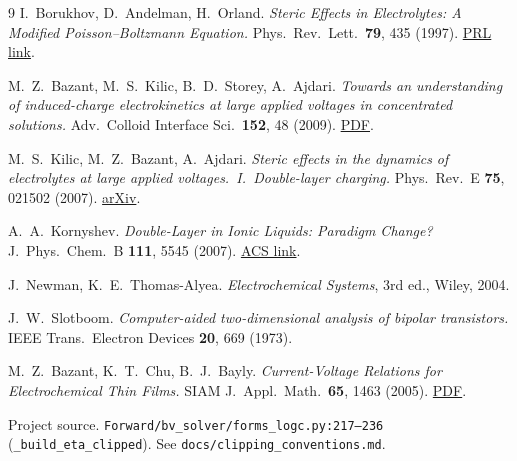 \documentclass[11pt]{article}
\begin{document}
\begin{thebibliography}{9}
I.\ Borukhov, D.\ Andelman, H.\ Orland.
\emph{Steric Effects in Electrolytes: A Modified Poisson--Boltzmann
Equation.}
Phys.\ Rev.\ Lett.\ \textbf{79}, 435 (1997).
\href{https://journals.aps.org/prl/abstract/10.1103/PhysRevLett.79.435}{PRL link}.

M.\ Z.\ Bazant, M.\ S.\ Kilic, B.\ D.\ Storey, A.\ Ajdari.
\emph{Towards an understanding of induced-charge electrokinetics at
large applied voltages in concentrated solutions.}
Adv.\ Colloid Interface Sci.\ \textbf{152}, 48 (2009).
\href{http://web.mit.edu/bazant/www/papers/pdf/Bazant_2009_ACIS.pdf}{PDF}.

M.\ S.\ Kilic, M.\ Z.\ Bazant, A.\ Ajdari.
\emph{Steric effects in the dynamics of electrolytes at large applied
voltages.\ I.\ Double-layer charging.}
Phys.\ Rev.\ E \textbf{75}, 021502 (2007).
\href{https://arxiv.org/abs/physics/0611030}{arXiv}.

A.\ A.\ Kornyshev.
\emph{Double-Layer in Ionic Liquids: Paradigm Change?}
J.\ Phys.\ Chem.\ B \textbf{111}, 5545 (2007).
\href{https://pubs.acs.org/doi/full/10.1021/jp067857o}{ACS link}.

J.\ Newman, K.\ E.\ Thomas-Alyea.
\emph{Electrochemical Systems}, 3rd ed., Wiley, 2004.

J.\ W.\ Slotboom.
\emph{Computer-aided two-dimensional analysis of bipolar transistors.}
IEEE Trans.\ Electron Devices \textbf{20}, 669 (1973).

M.\ Z.\ Bazant, K.\ T.\ Chu, B.\ J.\ Bayly.
\emph{Current-Voltage Relations for Electrochemical Thin Films.}
SIAM J.\ Appl.\ Math.\ \textbf{65}, 1463 (2005).
\href{http://web.mit.edu/bazant/www/papers/pdf/Bazant_2005_SIAM_J_Appl_Math_MTF2.pdf}{PDF}.

Project source.
\texttt{Forward/bv\_solver/forms\_logc.py:217--236}
(\texttt{\_build\_eta\_clipped}).
See \texttt{docs/clipping\_conventions.md}.
\end{thebibliography}
\end{document}
